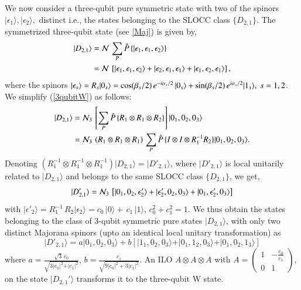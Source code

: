 We now consider a three-qubit pure symmetric state with two of the spinors $\vert \epsilon_1\rangle,\vert \epsilon_2\rangle,$ distinct i.e., the states belonging to the SLOCC class $\{D_{2,1}\}.$  The symmetrized three-qubit state (see \eqref{Maj}) is given by,   
\begin{align}
\vert D_{2,1}\rangle&={\cal N}\, \sum_{P}\hat{P}\left\{\vert \epsilon_1, \epsilon_1, \epsilon_2\rangle\right\}\nonumber \\
&={\cal N}\,\left[ \vert \epsilon_1, \epsilon_1, \epsilon_2\rangle +\vert \epsilon_2, \epsilon_1, \epsilon_1\rangle + \vert \epsilon_1, \epsilon_2, \epsilon_1\rangle \right],\label{3qubitW}
\end{align}
where the spinors $\vert\epsilon_s\rangle= R_s\vert 0_s\rangle=\cos(\beta_s/2)\, e^{-i\alpha_s/2}\, \vert 0_s\rangle +\sin(\beta_s/2)\, e^{i\alpha_s/2}\break \vert 1_s\rangle,\ s=1,2$. We simplify (\ref{3qubitW}) as follows: 
\begin{align}
\vert D_{2,1}\rangle &= {\cal N}_3\,\left[\sum_P {\hat P}\,\{R_1\otimes R_1\otimes R_2\}\right] \vert 0_1,0_2,0_3\rangle \nonumber\\ 
&= {\cal N}_3\, \left(R_1\otimes R_1\otimes R_1\right)\, \sum_P {\hat P}\, \{I\otimes I\otimes R_{1}^{-1}R_2 \} \vert 0_1,0_2,0_3\rangle.\label{3W2}
\end{align}
Denoting $\left(R^{-1}_1\otimes R^{-1}_1\otimes R^{-1}_1\right) \vert D_{2,1}\rangle=\vert D'_{2,1}\rangle$, where $\vert D'_{2,1}\rangle$  is local unitarily related to  $\vert D_{2,1}\rangle$ and belongs to the same SLOCC class $\{D_{2,1}\}$, we get, 
\begin{equation}
\vert D'_{2,1}\rangle={\cal N}_3\,\left[ \vert 0_1,0_2,\epsilon'_2\rangle  +\vert \epsilon'_2, 0_2, 0_3\rangle + \vert 0_1,  \epsilon'_2, 0_3\rangle \right]     
\end{equation}
with $\vert\epsilon'_2\rangle=R_1^{-1}\,R_2\vert \epsilon_2\rangle=c_0\,\vert 0\rangle +\, c_1\,\vert 1\rangle$, $c_0^2+c_1^2=1.$ We thus obtain the states belonging to the class of 3-qubit symmetric pure states  $\vert D_{2,1}\rangle$, with only two distinct Majorana spinors (upto an identical local unitary transformation) as
\begin{equation}
\vert D'_{2,1}\rangle=a\vert 0_1,0_2,0_3\rangle+b[\vert 1_1,0_2,0_3\rangle +\vert 0_1,1_2,0_3\rangle+\vert 0_1,0_2,1_3\rangle]\label{Wfin}
\end{equation}
where $a=\frac{\sqrt{3}\, c_0}{\sqrt{3\vert c_0\vert^2+\vert c_1\vert^2}}$, $b=\frac{ c_1}{\sqrt{9\vert c_0\vert^2+3\vert c_1\vert^2}}$. An ILO $A\otimes A\otimes A$  with  $A=\left(\begin{array}{cc} 1 & -\frac{c_0}{c_1} \\ 0 & 1 \end{array}\right)$, on the state $\vert D_{2,1}'\rangle$ transforms it to the three-qubit W state.
 
